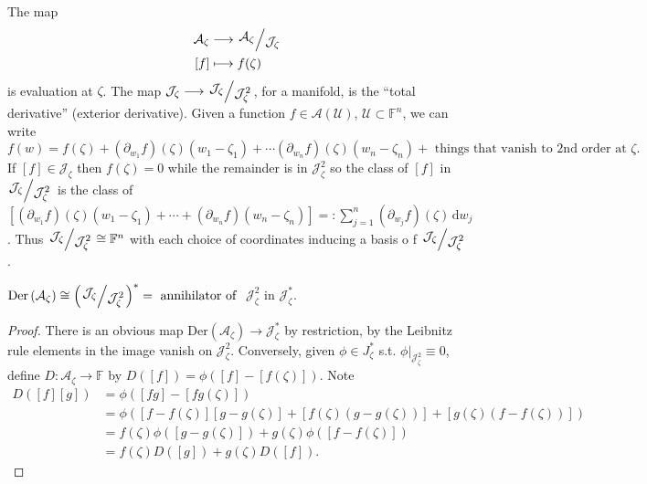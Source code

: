 The map
\begin{align*}
   \mathcal{A}_\zeta  &\longrightarrow \sfrac{\mathcal{A}_{\zeta }}{\mathcal{J}_{\zeta }} \\
   \left[ f \right]  &\longmapsto f(\zeta)
\end{align*}is evaluation at $\zeta$.
The map 
$\mathcal{J}_{\zeta } \longrightarrow  \sfrac{\mathcal{J}_{\zeta }}{\mathcal{J}_{\zeta }^2}$, for a manifold, is the ``total derivative'' (exterior derivative).
Given a function $f\in \mathcal{A}(\mathcal{U})$, $\mathcal{U}\subset \mathbb{F}^{n}$, we can write 
\[
  f(w)=f(\zeta)+\left( \partial_{w_1}f \right) (\zeta)(w_1-\zeta_1)+\cdots \left( \partial_{w_n }f \right) (\zeta)(w_n-\zeta_n)+\text{ things that vanish to 2nd order at }\zeta.
\] 
If $\left[ f \right] \in \mathcal{J}_{\zeta }$ then $f(\zeta)=0$ while the remainder is in $\mathcal{J}_\zeta^2$ so the class of $\left[ f \right] $ in $\sfrac{\mathcal{J}_\zeta }{\mathcal{J}_{\zeta }^2}$ is the class of $\left[ \left( \partial_{w_1 }f \right) (\zeta)(w_1-\zeta_1)+\cdots +\left( \partial_{w_n }f \right)\left( w_n-\zeta_n \right)   \right]=: \sum_{j=1}^{n} \left( \partial_{w_j}f \right) (\zeta) \,\mathrm{d} w_j$. Thus $\sfrac{\mathcal{J}_{\zeta }}{\mathcal{J}_{\zeta }^2}\cong \mathbb{F}^{n}$ with each choice of coordinates inducing a basis o f $\sfrac{\mathcal{J}_{\zeta }}{\mathcal{J}_{\zeta }^2}$.

\begin{claim} $\mathrm{Der}\left( \mathcal{A}_\zeta  \right) \cong \left( \sfrac{\mathcal{J}_{\zeta }}{\mathcal{J}^2_{\zeta }} \right) ^{*}= \text{ annihilator of }$ $\mathcal{J}_{\zeta }^2$ in $\mathcal{J}_\zeta ^{*}$.
\end{claim}
\begin{proof}
  There is an obvious map $\mathrm{Der}\left( \mathcal{A}_\zeta  \right) \to \mathcal{J}^{*}_{\zeta }$ by restriction, by the Leibnitz rule elements in the image vanish on $\mathcal{J}^2_{\zeta }$. Conversely, given $\phi \in J_{\zeta }^{*}$ s.t. $\phi|_{\mathcal{J}^2_{\zeta }}\equiv 0$, define $D:\mathcal{A}_{\zeta }\to \mathbb{F}$ by $D\left( \left[ f \right]  \right) =\phi \left( \left[ f \right] -\left[ f(\zeta) \right]  \right) $. Note 
  \begin{align*}
    D\left( \left[ f \right] \left[ g \right]  \right) &=\phi\left( \left[ fg \right] -\left[ fg(\zeta) \right]  \right) \\
						       &= \phi \left( \left[ f-f(\zeta) \right] \left[ g-g(\zeta) \right] +\left[ f(\zeta)(g-g(\zeta)) \right] +\left[ g(\zeta)\left( f-f(\zeta) \right)  \right]  \right) \\
						       &= f(\zeta) \phi\left( \left[ g-g(\zeta) \right]  \right) +g(\zeta)\phi\left( \left[ f-f(\zeta) \right]  \right)\\
						       &= f(\zeta)D\left( \left[ g \right]  \right) +g(\zeta) D\left( \left[ f \right]  \right)
  .\end{align*}
\end{proof}


